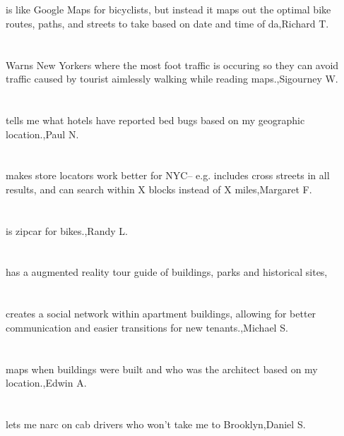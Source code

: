 \section{}is like Google Maps for bicyclists, but instead it maps out the optimal bike routes, paths, and streets to take based on date and time of da,Richard T.	
\section{}Warns New Yorkers where the most foot traffic is occuring so they can avoid traffic caused by tourist aimlessly walking while reading maps.,Sigourney W.	
\section{}tells me what hotels have reported bed bugs based on my geographic location.,Paul N.	
\section{}makes store locators work better for NYC-- e.g. includes cross streets in all results, and can search within X blocks instead of X miles,Margaret F.	
\section{}is zipcar for bikes.,Randy L.	 
\section{}has a augmented reality tour guide of buildings, parks and historical sites,	
\section{}creates a social network within apartment buildings, allowing for better communication and easier transitions for new tenants.,Michael S.	
\section{} maps when buildings were built and who was the architect based on my location.,Edwin A.	
\section{}lets me narc on cab drivers who won't take me to Brooklyn,Daniel S.	
